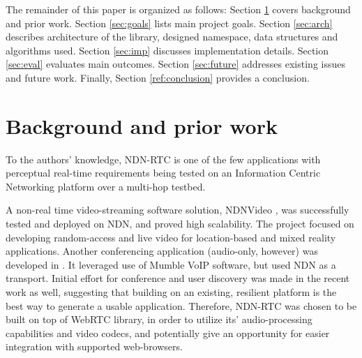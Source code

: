 \documentclass{icn/sig-alternate-2012} %
\newcommand{\ndnrtcName}{NDN-RTC} %
\begin{document}
The remainder of this paper is organized as follows: Section \ref{sec:bg} covers background and prior work. Section \ref{sec:goals} lists main project goals. Section \ref{sec:arch} describes architecture of the library, designed namespace, data structures and algorithms used. Section \ref{sec:imp} discusses implementation details. Section \ref{sec:eval} evaluates main outcomes. Section \ref{sec:future} addresses existing issues and future work. Finally, Section \ref{ref:conclusion} provides a conclusion.

\section{Background and prior work}
\label{sec:bg}
To the authors' knowledge, \ndnrtcName{} is one of the few applications with perceptual real-time requirements being tested on an Information Centric Networking platform over a multi-hop testbed. 

A non-real time video-streaming software solution, NDNVideo \cite{ndnvideo}, was successfully tested and deployed on NDN, and proved high scalability. The project focused on developing random-access and live video for location-based and mixed reality applications. Another conferencing application (audio-only, however) was developed in \cite{act-tool}. It leveraged use of Mumble VoIP software, but used NDN as a transport. Initial effort for conference and user discovery was made in the recent work as well, suggesting that building on an existing, resilient platform is the best way to generate a usable application. Therefore, \ndnrtcName{} was chosen to be built on top of WebRTC library, in order to utilize its' audio-processing capabilities and video codecs, and potentially give an opportunity for easier integration with supported web-browsers.


\end{document}
